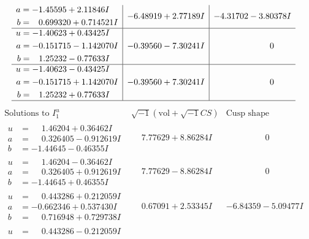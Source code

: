 \documentclass[1p]{elsarticle_modified}
\theoremstyle{definition}
\newcommand{\I}{\sqrt{-1}}
\begin{document}
$$\begin{array}{c|c|c}
\begin{aligned}
a &= -1.45595 + 2.11846 I \\
b &= \phantom{-}0.699320 + 0.714521 I\end{aligned}
 & -6.48919 + 2.77189 I & -4.31702 - 3.80378 I \\ \hline\begin{aligned}
u &= -1.40623 + 0.43425 I \\
a &= -0.151715 - 1.142070 I \\
b &= \phantom{-}1.25232 - 0.77633 I\end{aligned}
 & -0.39560 - 7.30241 I & \phantom{-0.000000 } 0 \\ \hline\begin{aligned}
u &= -1.40623 - 0.43425 I \\
a &= -0.151715 + 1.142070 I \\
b &= \phantom{-}1.25232 + 0.77633 I\end{aligned}
 & -0.39560 + 7.30241 I & \phantom{-0.000000 } 0\\
 \hline 
 \end{array}$$\newpage$$\begin{array}{c|c|c}  
\text{Solutions to }I^u_{1}& \I (\text{vol} + \sqrt{-1}CS) & \text{Cusp shape}\\
 \hline 
\begin{aligned}
u &= \phantom{-}1.46204 + 0.36462 I \\
a &= \phantom{-}0.326405 - 0.912619 I \\
b &= -1.44645 - 0.46355 I\end{aligned}
 & \phantom{-}7.77629 + 8.86284 I & \phantom{-0.000000 } 0 \\ \hline\begin{aligned}
u &= \phantom{-}1.46204 - 0.36462 I \\
a &= \phantom{-}0.326405 + 0.912619 I \\
b &= -1.44645 + 0.46355 I\end{aligned}
 & \phantom{-}7.77629 - 8.86284 I & \phantom{-0.000000 } 0 \\ \hline\begin{aligned}
u &= \phantom{-}0.443286 + 0.212059 I \\
a &= -0.662346 + 0.537430 I \\
b &= \phantom{-}0.716948 + 0.729738 I\end{aligned}
 & \phantom{-}0.67091 + 2.53345 I & -6.84359 - 5.09477 I \\ \hline\begin{aligned}
u &= \phantom{-}0.443286 - 0.212059 I \\

\end{aligned}
\end{array}$$
\end{document}
